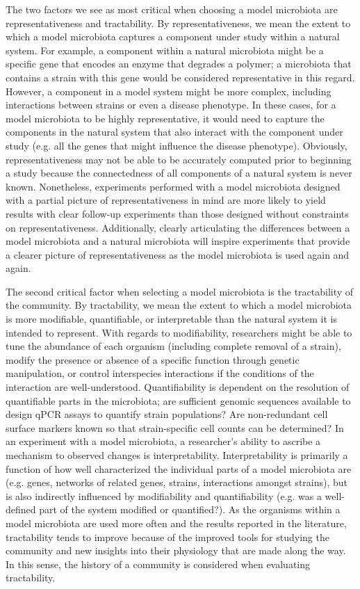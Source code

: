 \documentclass[11pt,onecolumn,notitlepage,openany,twoside]{book}
\begin{document}
\begin{refsection}
The two factors we see as most critical when choosing a model microbiota are representativeness and tractability. By representativeness, we mean the extent to which a model microbiota captures a component under study within a natural system. For example, a component within a natural microbiota might be a specific gene that encodes an enzyme that degrades a polymer; a microbiota that contains a strain with this gene would be considered representative in this regard. However, a component in a model system might be more complex, including interactions between strains or even a disease phenotype. In these cases, for a model microbiota to be highly representative, it would need to capture the components in the natural system that also interact with the component under study (e.g. all the genes that might influence the disease phenotype). Obviously, representativeness may not be able to be accurately computed prior to beginning a study because the connectedness of all components of a natural system is never known. Nonetheless, experiments performed with a model microbiota designed with a partial picture of representativeness in mind are more likely to yield results with clear follow-up experiments than those designed without constraints on representativeness. Additionally, clearly articulating the differences between a model microbiota and a natural microbiota will inspire experiments that provide a clearer picture of representativeness as the model microbiota is used again and again.

The second critical factor when selecting a model microbiota is the tractability of the community. By tractability, we mean the extent to which a model microbiota is more modifiable, quantifiable, or interpretable than the natural system it is intended to represent. With regards to modifiability, researchers might be able to tune the abundance of each organism (including complete removal of a strain), modify the presence or absence of a specific function through genetic manipulation, or control interspecies interactions if the conditions of the interaction are well-understood. Quantifiability is dependent on the resolution of quantifiable parts in the microbiota; are sufficient genomic sequences available to design qPCR assays to quantify strain populations? Are non-redundant cell surface markers known so that strain-specific cell counts can be determined? In an experiment with a model microbiota, a researcher’s ability to ascribe a mechanism to observed changes is interpretability. Interpretability is primarily a function of how well characterized the individual parts of a model microbiota are (e.g. genes, networks of related genes, strains, interactions amongst strains), but is also indirectly influenced by modifiability and quantifiability (e.g. was a well-defined part of the system modified or quantified?). As the organisms within a model microbiota are used more often and the results reported in the literature, tractability tends to improve because of the improved tools for studying the community and new insights into their physiology that are made along the way. In this sense, the history of a community is considered when evaluating tractability.


\end{refsection}
\end{document}
